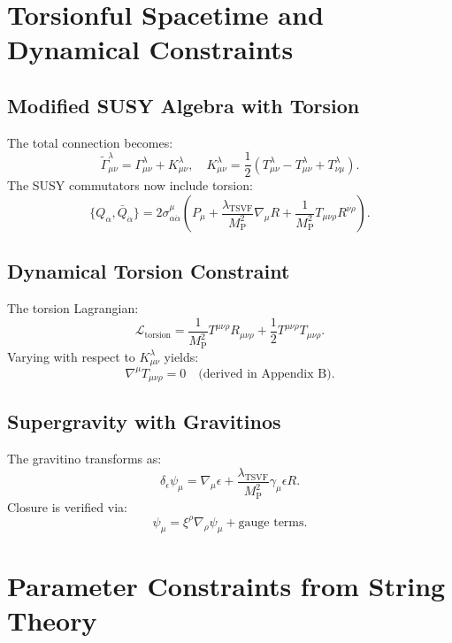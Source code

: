 \documentclass[12pt, onecolumn]{article}
\theoremstyle{definition}
\newcommand{\tsvf}{\lambda_{\mathrm{TSVF}}}
\newcommand{\Mp}{M_{\mathrm{P}}}
\numberwithin{equation}{section}
\begin{document}
\section{Torsionful Spacetime and Dynamical Constraints}
\subsection{Modified SUSY Algebra with Torsion}
The total connection becomes:
\begin{equation}
\tilde{\Gamma}^\lambda_{\mu\nu} = \Gamma^\lambda_{\mu\nu} + K^\lambda_{\mu\nu}, \quad K^\lambda_{\mu\nu} = \frac{1}{2} \left(T^\lambda_{\mu\nu} - T_{\mu\nu}^\lambda + T_{\nu\mu}^\lambda\right).
\end{equation}
The SUSY commutators now include torsion:
\begin{equation}
\{Q_\alpha, \bar{Q}_{\dot{\alpha}}\} = 2 \sigma^\mu_{\alpha\dot{\alpha}} \left( P_\mu + \frac{\tsvf}{\Mp^2} \nabla_\mu R + \frac{1}{\Mp^2} T_{\mu\nu\rho} R^{\nu\rho} \right).
\end{equation}

\subsection{Dynamical Torsion Constraint}
The torsion Lagrangian:
\begin{equation}
\mathcal{L}_{\text{torsion}} = \frac{1}{\Mp^2} T^{\mu\nu\rho} R_{\mu\nu\rho} + \frac{1}{2} T^{\mu\nu\rho} T_{\mu\nu\rho}.
\end{equation}
Varying with respect to \(K^\lambda_{\mu\nu}\) yields:
\begin{equation}
\nabla^\mu T_{\mu\nu\rho} = 0 \quad \text{(derived in Appendix B)}.
\end{equation}

\subsection{Supergravity with Gravitinos}
The gravitino transforms as:
\begin{equation}
\delta_\epsilon \psi_\mu = \nabla_\mu \epsilon + \frac{\tsvf}{\Mp^2} \gamma_\mu \epsilon R.
\end{equation}
Closure is verified via:
\begin{equation}
[\delta_{\epsilon_1}, \delta_{\epsilon_2}] \psi_\mu = \xi^\rho \nabla_\rho \psi_\mu + \text{gauge terms}.
\end{equation}

\section{Parameter Constraints from String Theory}
\label{sec:param_constraints}
\end{document}
